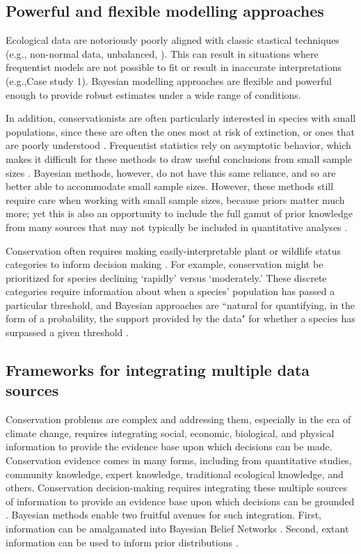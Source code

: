 \documentclass{article}
\begin{document}
\subsection*{Powerful and flexible modelling approaches}
\par Ecological data are notoriously poorly aligned with classic stastical techniques (e.g., non-normal data, unbalanced, ). This can result in situations where frequentist models are not possible to fit or result in inaccurate interpretations (e.g.,Case study 1). Bayesian modelling approaches are flexible and powerful enough to provide robust estimates under a wide range of conditions. 
\par In addition, conservationists are often particularly interested in species with small populations, since these are often the ones most at risk of extinction, or ones that are poorly understood \citep{stinchcombe2002influence}. Frequentist statistics rely on asymptotic behavior, which makes it difficult for these methods to draw useful conclusions from small sample sizes \citep{mcneish2016using}. Bayesian methods, however, do not have this same reliance, and so are better able to accommodate small sample sizes. However, these methods still require care when working with small sample sizes, because priors matter much more; yet this is also an opportunity to include the full gamut of prior knowledge from many sources that may not typically be included in quantitative analyses \citep{mcneish2016using}. 

\par Conservation often requires making easily-interpretable plant or wildlife status categories to inform decision making \citep{brooks2008quantifying}. For example, conservation might be prioritized for species declining `rapidly' versus `moderately.' These discrete categories require information about when a species' population has passed a particular threshold, and Bayesian approaches are ``natural for quantifying, in the form of a probability, the support provided by the data" for whether a species has surpassed a given threshold  \citep{brooks2008quantifying}. 

\subsection*{Frameworks for integrating multiple data sources}
\par Conservation problems are complex and addressing them, especially in the era of climate change, requires integrating social, economic, biological, and physical information to provide the evidence base upon which decisions can be made. Conservation evidence comes in many forms, including from quantitative studies, community knowledge, expert knowledge, traditional ecological knowledge, and others. Conservation decision-making requires integrating these multiple sources of information to provide an evidence base upon which decisions can be grounded \citep{stern2022interweaving}. Bayesian methods enable two fruitful avenues for such integration. First, information can be amalgamated into Bayesian Belief Networks \citep{marcot2001using,newton2007bayesian}. Second, extant information can be used to inform prior distributions \citep{o2008informed}. 
\end{document}
